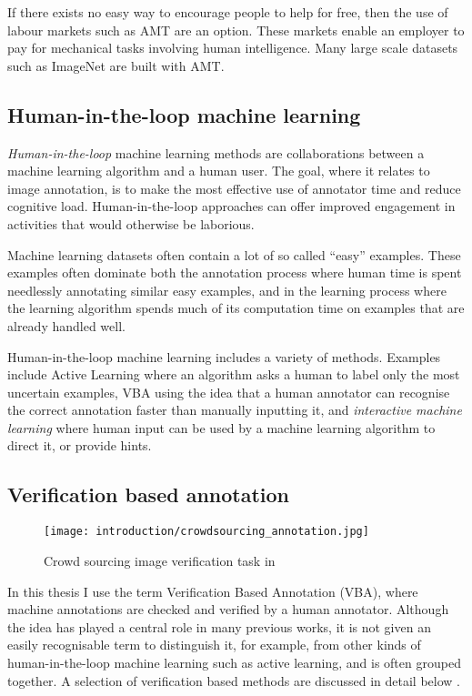 If there exists no easy way to encourage people to help for free, then the use of labour markets such as \gls{AMT} are an option. These markets enable an employer to pay for mechanical tasks involving human intelligence. Many large scale datasets such as ImageNet \cite{Russakovsky2015} are built with \gls{AMT}. 


\subsection{Human-in-the-loop machine learning}

\emph{Human-in-the-loop} machine learning methods are collaborations between a machine learning algorithm and a human user. The goal, where it relates to image annotation, is to make the most effective use of annotator time and reduce cognitive load. Human-in-the-loop approaches can offer improved engagement in activities that would otherwise be laborious.

Machine learning datasets often contain a lot of so called ``easy'' examples. These examples often dominate both the annotation process where human time is spent needlessly annotating similar easy examples, and in the learning process where the learning algorithm spends much of its computation time on examples that are already handled well. 

Human-in-the-loop machine learning includes a variety of methods. Examples include Active Learning where an algorithm asks a human to label only the most uncertain examples, \gls{VBA} using the idea that a human annotator can recognise the correct annotation faster than manually inputting it, and \emph{interactive machine learning} where human input can be used by a machine learning algorithm to direct it, or provide hints. 

\subsection{Verification based annotation}

\begin{figure}[h]
  \centering
  \texttt{[image: introduction/crowdsourcing\_annotation.jpg]}
  \caption{Crowd sourcing image verification task in \cite{Su2012a}} 
  \label{fig:crowdsourcing}
\end{figure}

In this thesis I use the term Verification Based Annotation (VBA), where machine annotations are checked and verified by a human annotator. Although the idea has played a central role in many previous works, it is not given an easily recognisable term to distinguish it, for example, from other kinds of human-in-the-loop machine learning such as active learning, and is often grouped together. A selection of verification based methods are discussed in detail below \cite{Yao2012, McNeill2011, Adhikaria2018, Castrejon2017, Papadopoulos2016, Russakovsky2015a}. 

